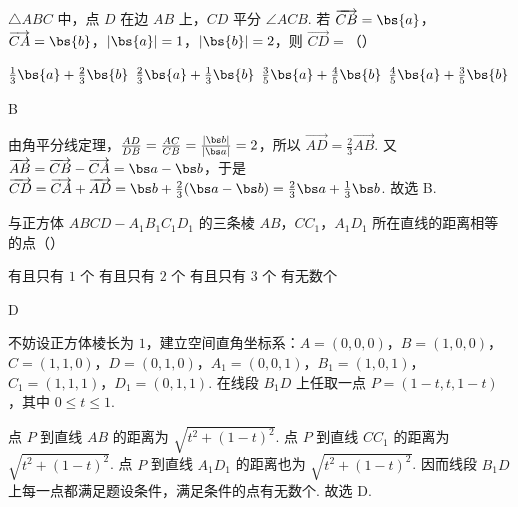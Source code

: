 \begin{problem}
\(\triangle ABC\) 中，点 \(D\) 在边 \(AB\) 上，\(CD\) 平分 \(\angle ACB\). 若 \(\overrightarrow{CB} = \bs{a}\)，\(\overrightarrow{CA} = \bs{b}\)，\(|\bs{a}| = 1\)，\(|\bs{b}| = 2\)，则 \(\overrightarrow{CD} =\)（\quad）

\choices
    {\(\frac{1}{3} \bs{a} + \frac{2}{3} \bs{b}\)}
    {\(\frac{2}{3} \bs{a} + \frac{1}{3} \bs{b}\)}
    {\(\frac{3}{5} \bs{a} + \frac{4}{5} \bs{b}\)}
    {\(\frac{4}{5} \bs{a} + \frac{3}{5} \bs{b}\)}

\begin{answer}
B
\end{answer}

\begin{solution}
由角平分线定理，\(\frac{AD}{DB}=\frac{AC}{CB}=\frac{|\bs b|}{|\bs a|}=2\)，所以 \(\overrightarrow{AD}=\frac{2}{3}\overrightarrow{AB}\). 又 \(\overrightarrow{AB}=\overrightarrow{CB}-\overrightarrow{CA}=\bs a-\bs b\)，于是 \(\overrightarrow{CD}=\overrightarrow{CA}+\overrightarrow{AD}=\bs b+\frac{2}{3}(\bs a-\bs b)=\frac{2}{3}\bs a+\frac{1}{3}\bs b\). 故选 B.
\end{solution}
\end{problem}

\begin{problem}
与正方体 \(ABCD - A_{1}B_{1}C_{1}D_{1}\) 的三条棱 \(AB\)，\(CC_{1}\)，\(A_{1}D_{1}\) 所在直线的距离相等的点（\quad）

\choices
    {有且只有 \(1\text{ 个}\)}
    {有且只有 \(2\text{ 个}\)}
    {有且只有 \(3\text{ 个}\)}
    {有无数个}

\begin{answer}
D
\end{answer}

\begin{solution}
不妨设正方体棱长为 \(1\)，建立空间直角坐标系：\(A=(0,0,0)\)，\(B=(1,0,0)\)，\(C=(1,1,0)\)，\(D=(0,1,0)\)，\(A_1=(0,0,1)\)，\(B_1=(1,0,1)\)，\(C_1=(1,1,1)\)，\(D_1=(0,1,1)\). 在线段 \(B_1D\) 上任取一点 \(P=(1-t,t,1-t)\)，其中 \(0\leqslant t\leqslant1\).

点 \(P\) 到直线 \(AB\) 的距离为 \(\sqrt{t^2+(1-t)^2}\). 点 \(P\) 到直线 \(CC_1\) 的距离为 \(\sqrt{t^2+(1-t)^2}\). 点 \(P\) 到直线 \(A_1D_1\) 的距离也为 \(\sqrt{t^2+(1-t)^2}\). 因而线段 \(B_1D\) 上每一点都满足题设条件，满足条件的点有无数个. 故选 D.
\end{solution}
\end{problem}

